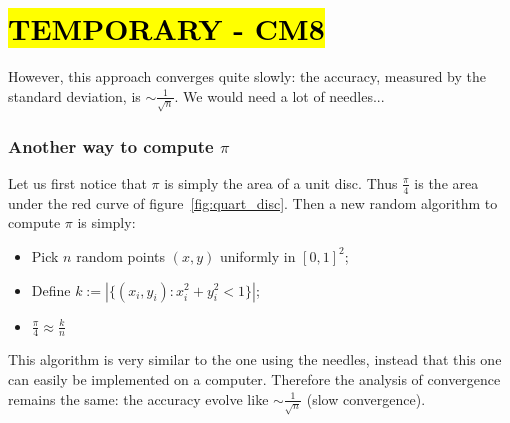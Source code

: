 \part*{\hl{TEMPORARY - CM8}}

However, this approach converges quite slowly: the accuracy, measured by the standard deviation, is $\sim \frac{1}{\sqrt{n}}$. We would need a lot of needles...

\section{Another way to compute $\pi$}

Let us first notice that $\pi$ is simply the area of a unit disc. Thus $\frac{\pi}{4}$ is the area under the red curve of figure~\ref{fig:quart_disc}. Then a new random algorithm to compute $\pi$ is simply:
\begin{itemize}
	\item Pick $n$ random points $(x,y)$ uniformly in $[0,1]^2$;
	\item Define $k:=|\{(x_i,y_i):x_i^2+y_i^2<1\}|$;
	\item $\frac{\pi}{4}\approx \frac{k}{n}$
\end{itemize}

This algorithm is very similar to the one using the needles, instead that this one can easily be implemented on a computer. Therefore the analysis of convergence remains the same: the accuracy evolve like $\sim \frac{1}{\sqrt{n}}$ (slow convergence).

\begin{figure}[h!]%
    \centering
    ~
		\\
		\caption{} 
		\label{fig:compute_pi}
\end{figure}

